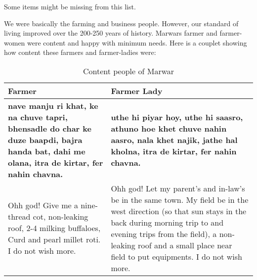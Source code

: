 Some items might be missing from this list.

We were basically the farming and business people. However, our standard of living improved over the 200-250 years of history. Marwars farmer and farmer-women were content and happy with minimum needs. Here is a couplet showing how content these farmers and farmer-ladies were:


\begin{table}
\begin{center}
\hspace*{-2cm}\begin{tabular}{p{7cm}|p{7cm}}
\hline
\textbf{Farmer} & \textbf{Farmer Lady}\\
\hline
\textbf{nave manju ri khat, ke na chuve tapri, bhensadle do char ke duze baapdi, bajra handa bat, dahi me olana, itra de kirtar, fer nahin chavna.} & 
\textbf{uthe hi piyar hoy, uthe hi saasro, athuno hoe khet chuve nahin aasro, nala khet najik, jathe hal kholna, itra de kirtar, fer nahin chavna.}\\
\hline
Ohh god! Give me a nine-thread cot, non-leaking roof, 2-4 milking buffaloes, Curd and pearl millet roti. I do not wish more. &
Ohh god! Let my parent's and in-law's be in the same town. My field be in the west direction (so that sun stays in the back during morning trip to and evening trips from the field), a non-leaking roof and a small place near field to put equipments. I do not wish more.\\
\hline
\end{tabular}
\end{center}
\caption{Content people of Marwar}
\label{tbl:farm}
\end{table}

